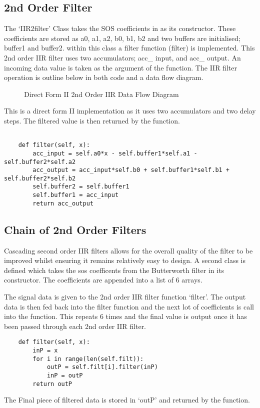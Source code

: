 \documentclass{article}
\begin{document}
\subsection{2nd Order Filter}
The `IIR2filter' Class takes the SOS coefficients in as its constructor. These coefficients are stored as a0, a1, a2, b0, b1, b2 and two buffers are initialised; buffer1 and buffer2. within this class a filter function (filter) is implemented. This 2nd order IIR filter uses two accumulators; acc\_ input, and acc\_ output. An incoming data value is taken as the argument of the function. The IIR filter operation is outline below in both code and a data flow diagram.
\newline
\begin{figure}[h!]
    \centering
    
    \caption{Direct Form II 2nd Order IIR Data Flow Diagram }
    \label{fig:universe}
\end{figure}
\newline 
This is a direct form II implementation as it uses two accumulators and two delay steps. The filtered value is then returned by the function. 
\newline
\newline
\begin{lstlisting}

    def filter(self, x): 
        acc_input = self.a0*x - self.buffer1*self.a1 - self.buffer2*self.a2 
        acc_output = acc_input*self.b0 + self.buffer1*self.b1 + self.buffer2*self.b2 
        self.buffer2 = self.buffer1
        self.buffer1 = acc_input
        return acc_output
\end{lstlisting}

\subsection{Chain of 2nd Order Filters}

Cascading second order IIR filters allows for the overall quality of the filter to be improved whilst ensuring it remains relatively easy to design. A second class is defined which takes the sos coefficents from the Butterworth filter in its constructor. The coefficients are appended into a list of 6 arrays. 

The signal data is given to the 2nd order IIR filter function `filter'. The output data is then fed back into the filter function and the next lot of coefficients is call into the function. This repeats 6 times and the final value is output once it has been passed through each 2nd order IIR filter. 
\newline
\begin{lstlisting}
    def filter(self, x): 
        inP = x
        for i in range(len(self.filt)):
            outP = self.filt[i].filter(inP)
            inP = outP
        return outP
\end{lstlisting}
\newline
\newline
The Final piece of filtered data is stored in `outP' and returned by the function. 
\newline
\end{document}

